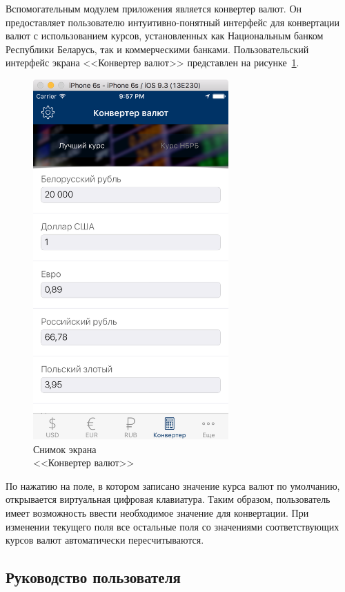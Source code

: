 Вспомогательным модулем приложения является конвертер валют. Он предоставляет
пользователю интуитивно-понятный интерфейс для конвертации валют с использованием
курсов, установленных как Национальным банком Республики Беларусь, так и
коммерческими банками.
Пользовательский интерфейс экрана <<Конвертер валют>> представлен на
рисунке~\ref{fig:converter_screen}.
\begin{figure}[h!]
  \centering
  \includegraphics[width=75mm]{fig/converter_screen}
  \caption{Снимок экрана \\ <<Конвертер валют>>}
  \label{fig:converter_screen}
\end{figure}

По нажатию на поле, в котором записано значение курса валют по умолчанию,
открывается виртуальная цифровая клавиатура. Таким образом, пользователь имеет
возможность ввести необходимое значение для конвертации. При изменении текущего
поля все остальные поля со значениями соответствующих курсов валют
автоматически пересчитываются.



\subsection{Руководство пользователя}

